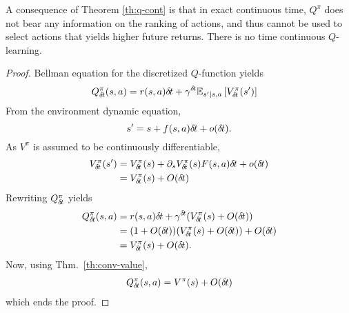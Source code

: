 A consequence of Theorem \ref{th:q-cont} is that in exact continuous time,
$Q^\pi$ does not bear any information on the ranking of actions, and
thus cannot be used to select actions that yields higher future returns. There is no time continuous $Q$-learning.

\begin{proof}
Bellman equation for the discretized $Q$-function yields
  \begin{align}
    Q^\pi_{\delta\hspace{-.1em}t}(s, a) &= r(s, a){\delta\hspace{-.1em}t} + \gamma^{\delta\hspace{-.1em}t} \mathbb{E}_{s'|s, a}\left[V^\pi_{\delta\hspace{-.1em}t}(s')\right] 
  \end{align}
  From the environment dynamic equation, 
  \begin{equation}
  s' = s + f(s, a) {\delta\hspace{-.1em}t} + o({\delta\hspace{-.1em}t}).
  \end{equation}As $V^\pi$ is assumed to be continuously differentiable,
  \begin{align}
  V^\pi_{\delta\hspace{-.1em}t}(s') &= V^\pi_{\delta\hspace{-.1em}t}(s) + \partial_s V^\pi_{\delta\hspace{-.1em}t}(s) F(s, a){\delta\hspace{-.1em}t} + o({\delta\hspace{-.1em}t})\\
		    &= V^\pi_{\delta\hspace{-.1em}t}(s) + O({\delta\hspace{-.1em}t})
  \end{align}
  Rewriting $Q^\pi_{\delta\hspace{-.1em}t}$ yields
  \begin{align}
  Q^\pi_{\delta\hspace{-.1em}t}(s, a) &= r(s, a){\delta\hspace{-.1em}t} + \gamma^{\delta\hspace{-.1em}t} (V^\pi_{\delta\hspace{-.1em}t}(s) + O({\delta\hspace{-.1em}t}))\\
		      &= (1 + O({\delta\hspace{-.1em}t})) (V^\pi_{\delta\hspace{-.1em}t}(s) + O({\delta\hspace{-.1em}t})) + O({\delta\hspace{-.1em}t})\\
		      &= V^\pi_{\delta\hspace{-.1em}t}(s) + O({\delta\hspace{-.1em}t}).
  \end{align}
  Now, using Thm.~\ref{th:conv-value},
  \begin{align}
  Q^\pi_{\delta\hspace{-.1em}t}(s, a) = V^\pi(s) + O({\delta\hspace{-.1em}t})
  \end{align}
  which ends the proof.
  \end{proof}
